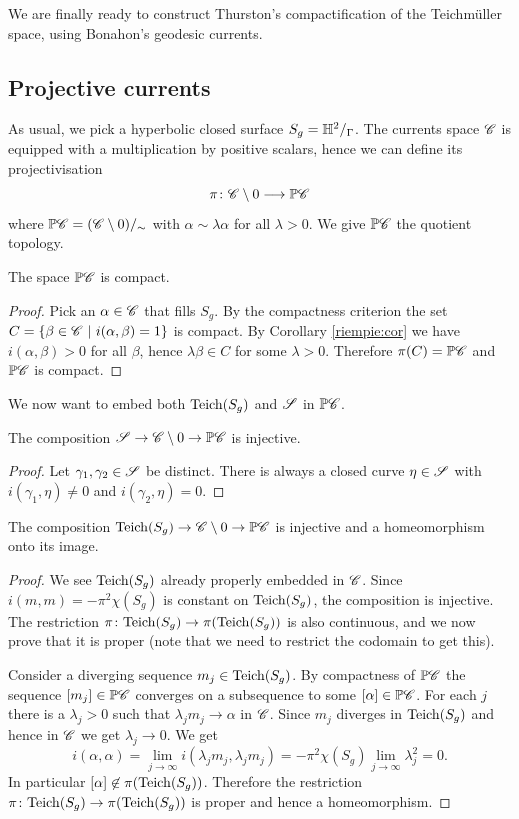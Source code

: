 We are finally ready to construct Thurston's compactification of the Teichm\"uller space, using Bonahon's geodesic currents. 

\subsection{Projective currents}
As usual, we pick a hyperbolic closed surface $S_g=\mathbb{H}^2/_\Gamma$.
The currents space $\mathscr{C}$ is equipped with a multiplication by positive scalars, hence we can define its projectivisation
$$\pi\colon \mathscr{C}\setminus 0 \longrightarrow \mathbb{P}\mathscr{C}$$
where $\mathbb{P} \mathscr{C} = (\mathscr{C} \setminus 0)/_\sim$ with $\alpha \sim \lambda \alpha$ for all $\lambda>0$. We give $\mathbb{P}\mathscr{C}$ the quotient topology.

\begin{prop} The space $\mathbb{P}\mathscr{C}$ is compact.
\end{prop}
\begin{proof}
Pick an $\alpha\in\mathscr{C}$ that fills $S_g$. By the compactness criterion the set $C = \{\beta\in\mathscr{C}\ |\ i(\alpha,\beta)=1\}$ is compact. By Corollary \ref{riempie:cor} we have $i(\alpha,\beta)>0$ for all $\beta$, hence $\lambda\beta \in C$ for some $\lambda>0$. Therefore $\pi(C) = \mathbb{P}\mathscr{C}$ and $\mathbb{P}\mathscr{C}$ is compact.
\end{proof}

We now want to embed both ${\rm Teich}(S_g)$ and $\mathscr{S}$ in $\mathbb{P}\mathscr{C}$.

\begin{prop}
The composition $\mathscr{S} \to \mathscr{C}\setminus 0 \to \mathbb{P}\mathscr{C}$ is injective.
\end{prop}
\begin{proof}
Let $\gamma_1,\gamma_2 \in\mathscr{S}$ be distinct. There is always a closed curve $\eta\in\mathscr{S}$ with $i(\gamma_1,\eta)\neq 0$ and $i(\gamma_2,\eta)=0$.
\end{proof}

\begin{prop} \label{embed:Teich:prop}
The composition ${\rm Teich}(S_g) \to \mathscr{C} \setminus 0\to \mathbb{P}\mathscr{C}$ is injective and a homeomorphism onto its image.
\end{prop}
\begin{proof}
We see ${\rm Teich}(S_g)$ already properly embedded in $\mathscr{C}$.
Since $i(m,m) = -\pi^2\chi(S_g)$ is constant on ${\rm Teich}(S_g)$, the composition is injective. The restriction $\pi\colon {\rm Teich}(S_g) \to \pi({\rm Teich}(S_g))$ is also continuous, and we now prove that it is proper (note that we need to restrict the codomain to get this).

Consider a diverging sequence $m_j\in {\rm Teich}(S_g)$. By compactness of $\mathbb{P}\mathscr{C}$ the sequence $[m_j]\in\mathbb{P}\mathscr{C}$ converges on a subsequence to some $[\alpha]\in\mathbb{P}\mathscr{C}$. For each $j$ there is a $\lambda_j>0$ such that $\lambda_jm_j \to \alpha$ in $\mathscr{C}$. Since $m_j$ diverges in ${\rm Teich}(S_g)$ and hence in $\mathscr{C}$ we get $\lambda_j\to 0$. We get
$$i(\alpha,\alpha) = \lim_{j\to \infty} i(\lambda_jm_j, \lambda_jm_j) =  -\pi^2\chi(S_g) \lim_{j\to \infty} \lambda_j^2 = 0.$$
In particular $[\alpha]\not\in \pi({\rm Teich}(S_g))$. Therefore the restriction $\pi\colon {\rm Teich}(S_g) \to \pi({\rm Teich}(S_g))$ is proper and hence a homeomorphism. 
\end{proof}


